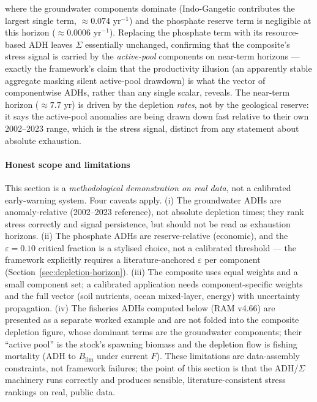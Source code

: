 \documentclass[twocolumn,10pt]{article}
\begin{document}
where the groundwater components dominate (Indo-Gangetic contributes the largest single term, $\approx0.074$ yr$^{-1}$) and the phosphate reserve term is negligible at this horizon ($\approx0.0006$ yr$^{-1}$). Replacing the phosphate term with its resource-based ADH leaves $\Sigma$ essentially unchanged, confirming that the composite's stress signal is carried by the \emph{active-pool} components on near-term horizons --- exactly the framework's claim that the productivity illusion (an apparently stable aggregate masking silent active-pool drawdown) is what the vector of componentwise ADHs, rather than any single scalar, reveals. The near-term horizon ($\approx7.7$ yr) is driven by the depletion \emph{rates}, not by the geological reserve: it says the active-pool anomalies are being drawn down fast relative to their own 2002--2023 range, which is the stress signal, distinct from any statement about absolute exhaustion.

\paragraph{Honest scope and limitations}
\label{sec:adh-scope}

This section is a \emph{methodological demonstration on real data}, not a calibrated early-warning system. Four caveats apply. (i) The groundwater ADHs are anomaly-relative (2002--2023 reference), not absolute depletion times; they rank stress correctly and signal persistence, but should not be read as exhaustion horizons. (ii) The phosphate ADHs are reserve-relative (economic), and the $\varepsilon=0.10$ critical fraction is a stylised choice, not a calibrated threshold --- the framework explicitly requires a literature-anchored $\varepsilon$ per component (Section~\ref{sec:depletion-horizon}). (iii) The composite uses equal weights and a small component set; a calibrated application needs component-specific weights and the full vector (soil nutrients, ocean mixed-layer, energy) with uncertainty propagation. (iv) The fisheries ADHs computed below (RAM v4.66) are presented as a separate worked example and are not folded into the composite depletion figure, whose dominant terms are the groundwater components; their ``active pool'' is the stock's spawning biomass and the depletion flow is fishing mortality (ADH to $B_{\text{lim}}$ under current $F$). These limitations are data-assembly constraints, not framework failures; the point of this section is that the ADH/$\Sigma$ machinery runs correctly and produces sensible, literature-consistent stress rankings on real, public data.
\end{document}
